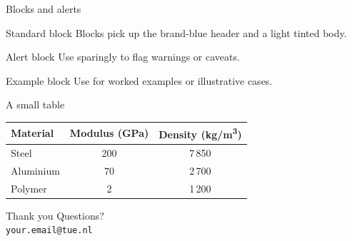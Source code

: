 \documentclass[aspectratio=169,11pt]{beamer}
\begin{document}
\begin{frame}{Blocks and alerts}
  \begin{block}{Standard block}
    Blocks pick up the brand-blue header and a light tinted body.
  \end{block}
  \begin{alertblock}{Alert block}
    Use sparingly to flag warnings or caveats.
  \end{alertblock}
  \begin{exampleblock}{Example block}
    Use for worked examples or illustrative cases.
  \end{exampleblock}
\end{frame}

\begin{frame}{A small table}
  \centering
  \begin{tabular}{lcc}
    \toprule
    Material & Modulus (GPa) & Density (kg/m\textsuperscript{3}) \\
    \midrule
    Steel    & 200 & 7\,850 \\
    Aluminium & 70 & 2\,700 \\
    Polymer  &   2 & 1\,200 \\
    \bottomrule
  \end{tabular}
\end{frame}

\begin{frame}{Thank you}
  \centering
  Questions?\\[1em]
  \small \texttt{your.email@tue.nl}
\end{frame}
\end{document}
